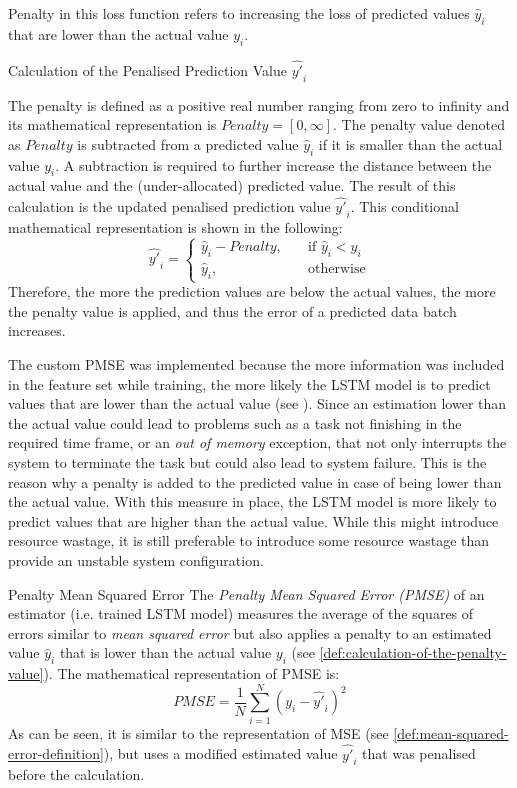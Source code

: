   Penalty in this loss function refers to increasing the loss of predicted values $\hat{y}_i$ that are lower than the actual value $y_i$.

  \begin{pabox}{Calculation of the Penalised Prediction Value $\hat{y'}_i$}
  \label{def:calculation-of-the-penalty-value}

    The penalty is defined as a positive real number ranging from zero to infinity and its mathematical representation is $Penalty = [0, \infty]$.
    The penalty value denoted as $Penalty$ is subtracted from a predicted value $\hat{y}_i$ if it is smaller than the actual value $y_i$. A subtraction is required to further increase the distance between the actual value and the (under-allocated) predicted value.
    The result of this calculation is the updated penalised prediction value $\hat{y'}_i$.
    This conditional mathematical representation is shown in the following:
    $$\hat{y'}_i = 
    \begin{cases}
      \hat{y}_i - Penalty, & \quad \textrm{if } \hat{y}_i < y_i \\
      \hat{y}_i,  & \quad \textrm{otherwise}
    \end{cases}$$
    Therefore, the more the prediction values are below the actual values, the more the penalty value is applied, and thus the error of a predicted data batch increases.

  \end{pabox}

  The custom PMSE was implemented because the more information was included in the feature set while training, the more likely the LSTM model is to predict values that are lower than the actual value (see ). Since an estimation lower than the actual value could lead to problems such as a task not finishing in the required time frame, or an \emph{out of memory} exception, that not only interrupts the system to terminate the task but could also lead to system failure. This is the reason why a penalty is added to the predicted value in case of being lower than the actual value. With this measure in place, the LSTM model is more likely to predict values that are higher than the actual value. While this might introduce resource wastage, it is still preferable to introduce some resource wastage than provide an unstable system configuration.

  \begin{pabox}{Penalty Mean Squared Error}
    \label{def:penalty-mean-squared-error-definition}
    The \emph{Penalty Mean Squared Error (PMSE)} of an estimator (i.e. trained LSTM model) measures the average of the squares of errors similar to \emph{mean squared error} but also applies a penalty to an estimated value $\hat{y}_i$ that is lower than the actual value $y_i$ (see \ref{def:calculation-of-the-penalty-value}). 
    The mathematical representation of PMSE is:
    $$PMSE = \frac{1}{N} \sum_{i = 1}^{N}\left(y_i - \hat{y'}_i\right)^2$$
    As can be seen, it is similar to the representation of MSE (see \ref{def:mean-squared-error-definition}), but uses a modified estimated value $\hat{y'}_i$ that was penalised before the calculation.
  \end{pabox}

